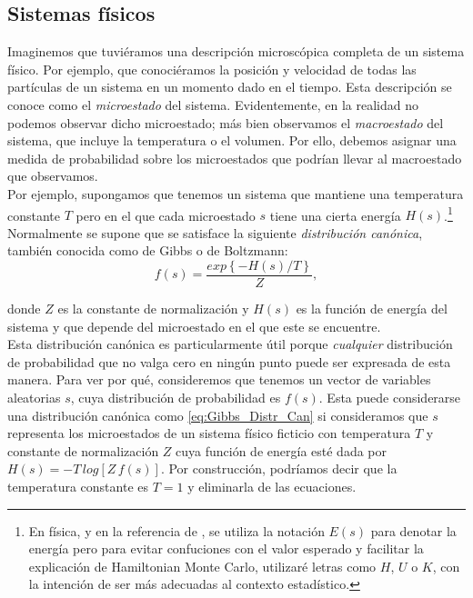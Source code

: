 \subsection{Sistemas físicos} 
 
 Imaginemos que tuviéramos una descripción microscópica completa de un sistema físico. Por ejemplo, que conociéramos la posición y velocidad de todas las partículas de un sistema en un momento dado en el tiempo. Esta descripción se conoce como el \textit{microestado} del sistema. Evidentemente, en la realidad no podemos observar dicho microestado; más bien observamos el \textit{macroestado} del sistema, que incluye la temperatura o el volumen. Por ello, debemos asignar una medida de probabilidad sobre los microestados que podrían llevar al macroestado que observamos.\\ 
 
 Por ejemplo, supongamos que tenemos un sistema que mantiene una temperatura constante $T$ pero en el que cada microestado $s$ tiene una cierta energía $H(s)$.\footnote{En física, y en la referencia de \textcite{Neal93}, se utiliza la notación $E(s)$ para denotar la energía pero para evitar confuciones con el valor esperado y facilitar la explicación de Hamiltonian Monte Carlo, utilizaré letras como $H$, $U$ o $K$, con la intención de ser más adecuadas al contexto estadístico.} Normalmente se supone que se satisface la siguiente \textit{distribución canónica}, también conocida como de Gibbs o de Boltzmann: 
\begin{equation}
\label{eq:Gibbs_Distr_Can}
 f(s) = \dfrac{exp\left\lbrace-H(s)/T\right\rbrace}{Z},
\end{equation}
 
 donde $Z$ es la constante de normalización y $H(s)$ es la función de energía del sistema y que depende del microestado en el que este se encuentre.\\
 
 Esta distribución canónica es particularmente útil porque \textit{cualquier} distribución de probabilidad que no valga cero en ningún punto puede ser expresada de esta manera. Para ver por qué, consideremos que tenemos un vector de variables aleatorias $s$, cuya distribución de probabilidad es $f(s)$. Esta puede considerarse una distribución canónica como \eqref{eq:Gibbs_Distr_Can} si consideramos que $s$ representa los microestados de un sistema físico ficticio con temperatura $T$ y constante de normalización $Z$ cuya función de energía esté dada por $H(s) = -T\,log\left[Z\,f(s)\right]$. Por construcción, podríamos decir que la temperatura constante es $T=1$ y eliminarla de las ecuaciones.\\ 
 
